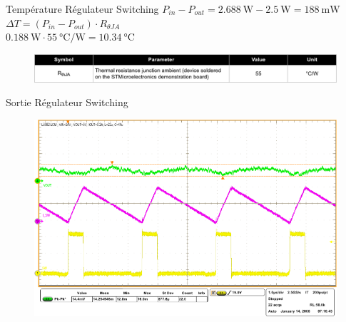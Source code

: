 \begin{frame}{Température Régulateur Switching}
    \centering
    $P_{in} - P_{out} = \SI{2.688}{\watt} - \SI{2.5}{\watt} = \SI{188}{\milli\watt}$\\
    \vspace{12pt}
    $\Delta T = (P_{in} - P_{out}) \cdot R_{\theta JA}$\\

    \vspace{24pt}
     {
        $\SI{0.188}{\watt} \cdot \SI{55}{\celsius\per\watt} = \SI{10.34}{\celsius}$
    }

    \vfill
    \begin{figure}
        \includegraphics[width=\textwidth, height=0.75\textheight, keepaspectratio]{pictures/l6982-thermal-information.png}
    \end{figure}
\end{frame}

\begin{frame}{Sortie Régulateur Switching}
    \begin{figure}
        \includegraphics[width=\textwidth, height=0.75\textheight, keepaspectratio]{pictures/l6982-output.png}
    \end{figure}
\end{frame}
